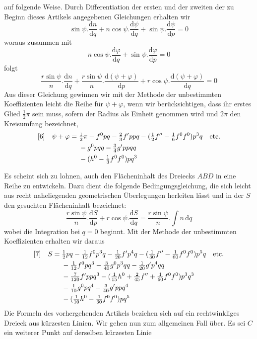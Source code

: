%
auf folgende Weise. Durch Differentiation der ersten und der zweiten der zu Beginn dieses Artikels angegebenen Gleichungen erhalten wir
\[
\sin\psi\mathord{.}\frac{\mathrm{d}n}{\mathrm{d}q}+n\cos\psi\mathord{.}\frac{\mathrm{d}\psi}{\mathrm{d}q}+\sin\psi\mathord{.}\frac{\mathrm{d}\psi}{\mathrm{d}p}=0
\]
woraus zusammen mit
\[
n\cos\psi\mathord{.}\frac{\mathrm{d}\varphi}{\mathrm{d}q}+\sin\psi\mathord{.}\frac{\mathrm{d}\varphi}{\mathrm{d}p}=0
\]
folgt
\[
\frac{r\sin\psi}{n}\mathord{.}\frac{\mathrm{d}n}{\mathrm{d}q}+\frac{r\sin\psi}{n}\mathord{.}\frac{\mathrm{d}(\psi+\varphi)}{\mathrm{d}p}+r\cos\psi\mathord{.}\frac{\mathrm{d}(\psi+\varphi)}{\mathrm{d}q}=0
\]
Aus dieser Gleichung gewinnen wir mit der Methode der unbestimmten Koeffizienten leicht die Reihe für \(\psi+\varphi\), wenn wir berücksichtigen, dass ihr erstes Glied \(\tfrac{1}{2}\pi\) sein muss, sofern der Radius als Einheit genommen wird und \(2\pi\) den Kreisumfang bezeichnet,
\[
\begin{aligned}
\relax[6]\quad\psi+\varphi={}&\tfrac{1}{2}\pi-f^0pq-\tfrac{2}{3}f'ppq-(\tfrac{1}{2}f''-\tfrac{1}{6}f^0f^0)p^3q\quad\text{etc.}\\
&-g^0pqq-\tfrac{3}{4}g'ppqq\\
&-(h^0-\tfrac{1}{3}f^0f^0)pq^3
\end{aligned}
\]

Es scheint sich zu lohnen, auch den Flächeninhalt des Dreiecks \(ABD\) in eine Reihe zu entwickeln. Dazu dient die folgende Bedingungsgleichung, die sich leicht aus recht naheliegenden geometrischen Überlegungen herleiten lässt und in der \(S\) den gesuchten Flächeninhalt bezeichnet:
\[
\frac{r\sin\psi}{n}\mathord{.}\frac{\mathrm{d}S}{\mathrm{d}p}+r\cos\psi\mathord{.}\frac{\mathrm{d}S}{\mathrm{d}q}=\frac{r\sin\psi}{n}\mathord{.}\int n\,\mathrm{d}q
\]
wobei die Integration bei \(q=0\) beginnt. Mit der Methode der unbestimmten Koeffizienten erhalten wir daraus
\[
\begin{aligned}
\relax[7]\quad S={}&\tfrac{1}{2}pq-\tfrac{1}{12}f^0p^3q-\tfrac{1}{20}f'p^4q-(\tfrac{1}{30}f''-\tfrac{1}{60}f^0f^0)p^5q\quad\text{etc.}\\
&-\tfrac{1}{12}f^0pq^3-\tfrac{3}{40}g^0p^3qq-\tfrac{1}{20}g'p^4qq\\
&-\tfrac{7}{120}f'ppq^3-(\tfrac{1}{15}h^0+\tfrac{2}{45}f''+\tfrac{1}{60}f^0f^0)p^3q^3\\
&-\tfrac{1}{10}g^0pq^4-\tfrac{3}{40}g'ppq^4\\
&-(\tfrac{1}{10}h^0-\tfrac{1}{30}f^0f^0)pq^5
\end{aligned}
\]
Die Formeln des vorhergehenden Artikels beziehen sich auf ein rechtwinkliges Dreieck aus kürzesten Linien. Wir gehen nun zum allgemeinen Fall über. Es sei \(C\) ein weiterer Punkt auf derselben kürzesten Linie

